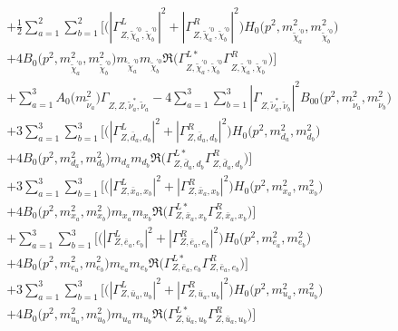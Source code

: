 \begin{itemize}
\begin{align}
 &+\frac{1}{2} \sum_{a=1}^{2}\sum_{b=1}^{2} \Big[\Big(|{\Gamma^L_{Z,\tilde{\chi}^{'0}_{{a}},\tilde{\chi}^{'0}_{{b}}}}|^2 + |{\Gamma^R_{Z,\tilde{\chi}^{'0}_{{a}},\tilde{\chi}^{'0}_{{b}}}}|^2\Big){H_0\Big(p^{2},m^2_{\tilde{\chi}^{'0}_{{a}}},m^2_{\tilde{\chi}^{'0}_{{b}}}\Big)} \nonumber \\ & +4 {B_0\Big(p^{2},m^2_{\tilde{\chi}^{'0}_{{a}}},m^2_{\tilde{\chi}^{'0}_{{b}}}\Big)} m_{\tilde{\chi}^{'0}_{{a}}} m_{\tilde{\chi}^{'0}_{{b}}} {\Re\Big({\Gamma^{L*}_{Z,\tilde{\chi}^{'0}_{{a}},\tilde{\chi}^{'0}_{{b}}}} {\Gamma^R_{Z,\tilde{\chi}^{'0}_{{a}},\tilde{\chi}^{'0}_{{b}}}} \Big)} \Big] \nonumber \\ 
 &+\sum_{a=1}^{3}{A_0\Big(m^2_{\tilde{\nu}_{{a}}}\Big)} {\Gamma_{Z,Z,\tilde{\nu}^*_{{a}},\tilde{\nu}_{{a}}}} -4 \sum_{a=1}^{3}\sum_{b=1}^{3}|{\Gamma_{Z,\tilde{\nu}^*_{{a}},\tilde{\nu}_{{b}}}}|^2 {B_{00}\Big(p^{2},m^2_{\tilde{\nu}_{{a}}},m^2_{\tilde{\nu}_{{b}}}\Big)}  \nonumber \\ 
 &+3 \sum_{a=1}^{3}\sum_{b=1}^{3} \Big[\Big(|{\Gamma^L_{Z,\bar{d}_{{a}},d_{{b}}}}|^2 + |{\Gamma^R_{Z,\bar{d}_{{a}},d_{{b}}}}|^2\Big){H_0\Big(p^{2},m^2_{d_{{a}}},m^2_{d_{{b}}}\Big)} \nonumber \\ & +4 {B_0\Big(p^{2},m^2_{d_{{a}}},m^2_{d_{{b}}}\Big)} m_{d_{{a}}} m_{d_{{b}}} {\Re\Big({\Gamma^{L*}_{Z,\bar{d}_{{a}},d_{{b}}}} {\Gamma^R_{Z,\bar{d}_{{a}},d_{{b}}}} \Big)} \Big] \nonumber \\ 
 &+3 \sum_{a=1}^{3}\sum_{b=1}^{3} \Big[\Big(|{\Gamma^L_{Z,\bar{x}_{{a}},x_{{b}}}}|^2 + |{\Gamma^R_{Z,\bar{x}_{{a}},x_{{b}}}}|^2\Big){H_0\Big(p^{2},m^2_{x_{{a}}},m^2_{x_{{b}}}\Big)} \nonumber \\ & +4 {B_0\Big(p^{2},m^2_{x_{{a}}},m^2_{x_{{b}}}\Big)} m_{x_{{a}}} m_{x_{{b}}} {\Re\Big({\Gamma^{L*}_{Z,\bar{x}_{{a}},x_{{b}}}} {\Gamma^R_{Z,\bar{x}_{{a}},x_{{b}}}} \Big)} \Big] \nonumber \\ 
 &+\sum_{a=1}^{3}\sum_{b=1}^{3} \Big[\Big(|{\Gamma^L_{Z,\bar{e}_{{a}},e_{{b}}}}|^2 + |{\Gamma^R_{Z,\bar{e}_{{a}},e_{{b}}}}|^2\Big){H_0\Big(p^{2},m^2_{e_{{a}}},m^2_{e_{{b}}}\Big)} \nonumber \\ & +4 {B_0\Big(p^{2},m^2_{e_{{a}}},m^2_{e_{{b}}}\Big)} m_{e_{{a}}} m_{e_{{b}}} {\Re\Big({\Gamma^{L*}_{Z,\bar{e}_{{a}},e_{{b}}}} {\Gamma^R_{Z,\bar{e}_{{a}},e_{{b}}}} \Big)} \Big]\nonumber \\ 
 &+3 \sum_{a=1}^{3}\sum_{b=1}^{3} \Big[\Big(|{\Gamma^L_{Z,\bar{u}_{{a}},u_{{b}}}}|^2 + |{\Gamma^R_{Z,\bar{u}_{{a}},u_{{b}}}}|^2\Big){H_0\Big(p^{2},m^2_{u_{{a}}},m^2_{u_{{b}}}\Big)} \nonumber \\ & +4 {B_0\Big(p^{2},m^2_{u_{{a}}},m^2_{u_{{b}}}\Big)} m_{u_{{a}}} m_{u_{{b}}} {\Re\Big({\Gamma^{L*}_{Z,\bar{u}_{{a}},u_{{b}}}} {\Gamma^R_{Z,\bar{u}_{{a}},u_{{b}}}} \Big)} \Big] \nonumber \\ 

\end{align}
\end{itemize}

